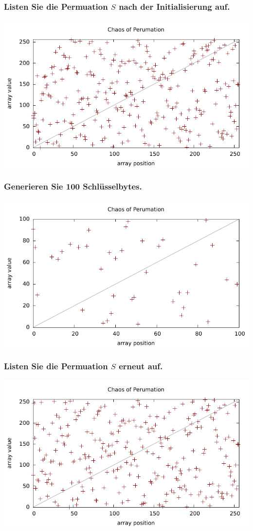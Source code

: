 \subsubsection{Listen Sie die Permuation $S$ nach der Initialisierung auf.}

\includegraphics[width=\textwidth]{eclipse/beforerc4.pdf}

\subsubsection{Generieren Sie 100 Schlüsselbytes.}
\includegraphics[width=\textwidth]{eclipse/rc4-key-seq.pdf}

\subsubsection{Listen Sie die Permuation $S$ erneut auf.}
\includegraphics[width=\textwidth]{eclipse/afterrc4.pdf}